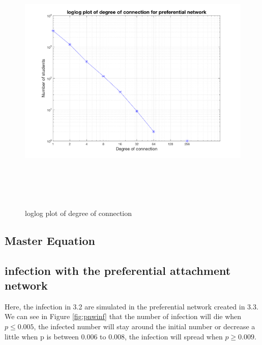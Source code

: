 \documentclass[12pt]{article}
\begin{document}
\begin{figure}[H] %
\centering
\includegraphics[width = 16 cm, height = 13cm]{p_nw.png}
\caption{loglog plot of degree of connection}
\label{fig:degreeloglog}
\end{figure}


\newpage
\subsection{Master Equation}







\newpage
\subsection{infection with the preferential attachment network}

Here, the infection in 3.2 are simulated in the preferential network created in 3.3. We can see in Figure \ref{fig:pnwinf} that the number of infection will die when $p \leq 0.005$, the infected number will stay around the initial number or decrease a little when p is between 0.006 to 0.008, the infection will spread when $p \geq 0.009$. \par
\end{document}
